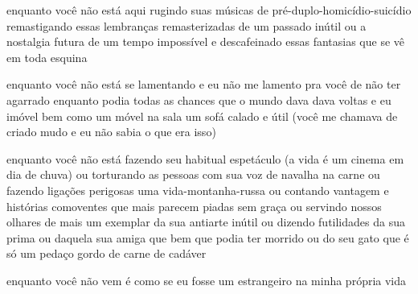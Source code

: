 \begin{poem}
\begin{stanza}
enquanto você não está aqui\verseline
rugindo suas músicas de\verseline
pré-duplo-homicídio-suicídio\verseline
remastigando essas lembranças\verseline
remasterizadas\verseline
de um passado inútil\verseline
ou a nostalgia futura\verseline
de um tempo impossível\verseline
e descafeinado \qquad essas\verseline
fantasias que se vê em toda esquina
\end{stanza}
\begin{stanza}
enquanto você não está se lamentando\verseline
e eu não me lamento pra você\verseline
de não ter agarrado enquanto podia\verseline
todas as chances que o mundo\verseline
dava \quad dava \quad voltas e eu imóvel\verseline
bem como um móvel na sala\verseline
um sofá \qquad calado e útil\verseline
(você me chamava de\verseline
\qquad \qquad criado mudo\verseline
e eu não sabia o que era isso)
\end{stanza}
\begin{stanza}
enquanto você não está fazendo\verseline
seu habitual espetáculo\verseline
\qquad (a vida é um cinema em\verseline
\qquad \qquad dia de chuva)\verseline
ou torturando as pessoas com\verseline
sua voz de navalha na carne\verseline
ou fazendo ligações perigosas\verseline
\qquad uma vida-montanha-russa\verseline
ou contando vantagem e\verseline
histórias comoventes que mais parecem\verseline
piadas sem graça\verseline
ou servindo nossos olhares\verseline
de mais um exemplar\verseline
da sua antiarte inútil\verseline
ou dizendo futilidades\verseline
da sua prima ou daquela\verseline
sua amiga que bem que\verseline
podia ter morrido\verseline
ou do seu gato\verseline
que é só um pedaço gordo\verseline
de carne de cadáver
\end{stanza}
\begin{stanza}
enquanto você não vem\verseline
é como se eu fosse um estrangeiro\verseline
na minha própria vida
\end{stanza}
\end{poem}